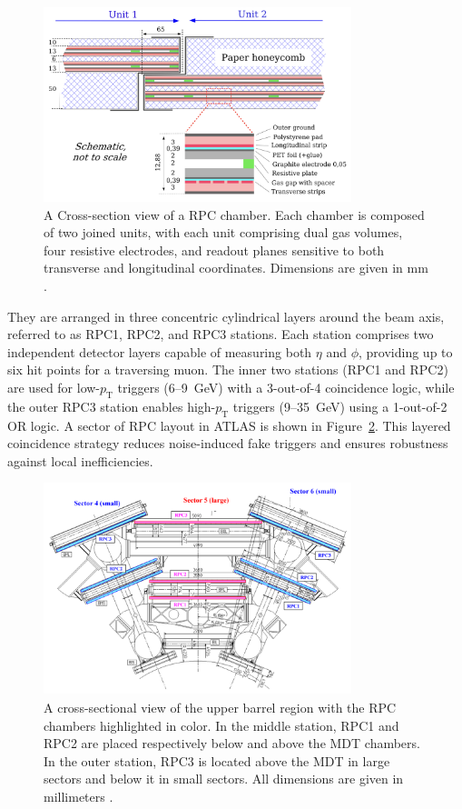 \begin{figure}[htbp]
  \centering
  \includegraphics[width=0.8\textwidth]{figs/chapter2/RPC_cross_section.png}
  \caption{A Cross-section view of a RPC chamber. Each chamber is composed of two joined units, with each unit comprising dual gas volumes, four resistive electrodes, and readout planes sensitive to both transverse and longitudinal coordinates. Dimensions are given in mm \cite{ATLASDetector2008}.}
  \label{fig:RPC_cross_section}
\end{figure}

They are arranged in three concentric cylindrical layers around the beam axis, referred to as RPC1, RPC2, and RPC3 stations. Each station comprises two independent detector layers capable of measuring both $\eta$ and $\phi$, providing up to six hit points for a traversing muon. The inner two stations (RPC1 and RPC2) are used for low-$p_\mathrm{T}$ triggers (6--9~GeV) with a 3-out-of-4 coincidence logic, while the outer RPC3 station enables high-$p_\mathrm{T}$ triggers (9--35~GeV) using a 1-out-of-2 OR logic. A sector of RPC layout in ATLAS is shown in Figure~\ref{fig:RPC_layout}. This layered coincidence strategy reduces noise-induced fake triggers and ensures robustness against local inefficiencies. 

\begin{figure}[htbp]
  \centering
  \includegraphics[width=0.8\textwidth]{figs/chapter2/RPC_layout.png}
  \caption{A cross-sectional view of the upper barrel region with the RPC chambers highlighted in color. In the middle station, RPC1 and RPC2 are placed respectively below and above the MDT chambers. In the outer station, RPC3 is located above the MDT in large sectors and below it in small sectors. All dimensions are given in millimeters \cite{ATLASDetector2008}.}
  \label{fig:RPC_layout}
\end{figure}

